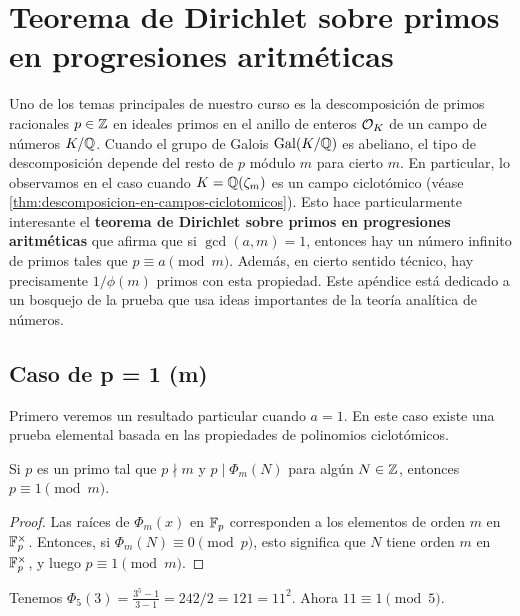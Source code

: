 \chapter{Teorema de Dirichlet sobre primos en progresiones aritméticas}
\label{ap:Dirichlet}


Uno de los temas principales de nuestro curso es la descomposición de primos
racionales $p \in \mathbb{Z}$ en ideales primos en el anillo de enteros $\mathcal{O}_K$ de un
campo de números $K/\mathbb{Q}$. Cuando el grupo de Galois $\operatorname{Gal} (K/\mathbb{Q})$ es abeliano,
el tipo de descomposición depende del resto de $p$ módulo $m$ para cierto $m$.
En particular, lo observamos en el caso cuando $K = \mathbb{Q} (\zeta_m)$ es un campo
ciclotómico (véase \ref{thm:descomposicion-en-campos-ciclotomicos}).
Esto hace particularmente interesante el
\textbf{teorema de Dirichlet sobre primos en progresiones aritméticas} que
afirma que si $\gcd (a,m) = 1$, entonces hay un número infinito de primos tales
que $p \equiv a \pmod{m}$. Además, en cierto sentido técnico, hay precisamente
$1/\phi(m)$ primos con esta propiedad. Este apéndice está dedicado a un bosquejo
de la prueba que usa ideas importantes de la teoría analítica de números.


\section{Caso de p = 1 (m)}

Primero veremos un resultado particular cuando $a = 1$. En este caso existe una
prueba elemental basada en las propiedades de polinomios ciclotómicos.

\begin{lema}
  Si $p$ es un primo tal que $p \nmid m$ y $p \mid \Phi_m (N)$ para algún
  $N \in \mathbb{Z}$, entonces $p \equiv 1 \pmod{m}$.

  \begin{proof}
    Las raíces de $\Phi_m (x)$ en $\mathbb{F}_p$ corresponden a los elementos de orden
    $m$ en $\mathbb{F}_p^\times$. Entonces, si $\Phi_m (N) \equiv 0 \pmod{p}$, esto
    significa que $N$ tiene orden $m$ en $\mathbb{F}_p^\times$, y luego
    $p\equiv 1\pmod{m}$.
  \end{proof}
\end{lema}

\begin{ejemplo}
  Tenemos $\Phi_5 (3) = \frac{3^5 - 1}{3 - 1} = 242/2 = 121 = 11^2$.
  Ahora $11 \equiv 1 \pmod{5}$.
\end{ejemplo}


